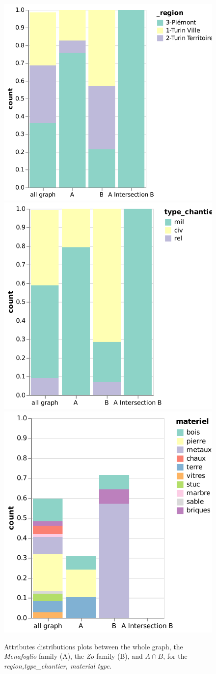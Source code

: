 \begin{figure}[!ht]
    \centering


    \includegraphics[width=0.3\linewidth]{static/figures/ComBiNet/OriginalPaperFigures/CGF/MenaZoPlots/v2/region.pdf}
     \includegraphics[width=0.3\linewidth]{static/figures/ComBiNet/OriginalPaperFigures/CGF/MenaZoPlots/v2/type-chantier.pdf}
     \includegraphics[width=0.3\linewidth]{static/figures/ComBiNet/OriginalPaperFigures/CGF/MenaZoPlots/v2/materiel.pdf}

    \caption{Attributes distributions plots between the whole graph, the \textit{Menafoglio} family (A), the \textit{Zo} family (B), and $A\cap B$, for the \textit{region,type\_chantier,  material type.}
    \label{fig:useCasePascal}}
\end{figure}

